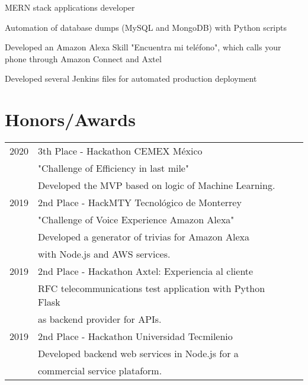 \documentclass[letterpaper]{deedy-resume} %
\begin{document}
\begin{minipage}[t]{0.66\textwidth}

\begin{tightitemize}
\item MERN stack applications developer
\item Automation of database dumps (MySQL and MongoDB) with Python scripts
\item Developed an Amazon Alexa Skill "Encuentra mi teléfono", which calls your phone through Amazon Connect and Axtel
\item Developed several Jenkins files for automated production deployment
\end{tightitemize}


\section{Honors/Awards} 

\begin{tabular}{rll}
2020 & 3th Place - Hackathon CEMEX México \\
& "Challenge of Efficiency in last mile" \\
& Developed the MVP based on logic of Machine Learning. \\
2019 & 2nd Place - HackMTY Tecnológico de Monterrey \\
& "Challenge of Voice Experience Amazon Alexa" \\ 
& Developed a generator of trivias for Amazon Alexa \\
& with Node.js and AWS services. \\
2019 & 2nd Place - Hackathon Axtel: Experiencia al cliente \\
& RFC telecommunications test application with Python Flask \\
& as backend provider for APIs. \\
2019 & 2nd Place - Hackathon Universidad Tecmilenio \\
& Developed backend web services in Node.js for a \\ 
& commercial service plataform. \\
\end{tabular}

\sectionspace %


\end{minipage}
\end{document}
